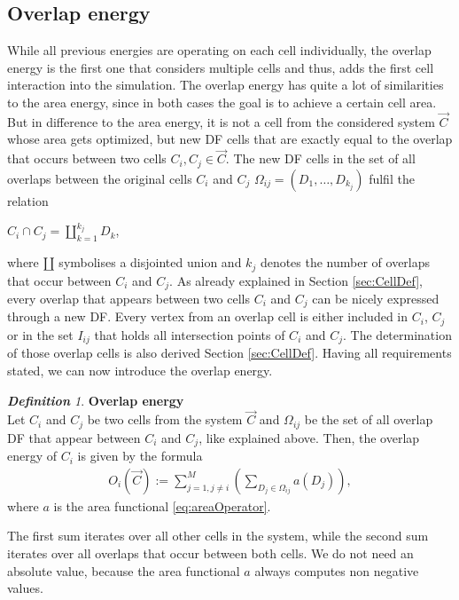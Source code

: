 \documentclass[a4paper,12pt,leqno]{article}
\theoremstyle{plain}
\theoremstyle{remark}
\newtheorem{definition}[theorem]{\bf Definition}
\begin{document}
\subsection{Overlap energy}  \label{sec:overlapEnergy} 
While all previous energies are operating on each cell individually, the overlap energy is the first one that considers multiple cells and thus, adds the first cell interaction into the simulation. The overlap energy has quite a lot of similarities to the area energy, since in both cases the goal is to achieve a certain cell area. \\
But in difference to the area energy, it is not a cell from the considered system $\vec{C}$ whose area gets optimized, but new DF cells that are exactly equal to the overlap that occurs between two cells $C_i, C_j \in \vec{C}$. The new DF cells in the set of all overlaps between the original cells $C_i$ and $C_j$ $\Omega_{ij} = (D_1, \ldots, D_{k_j})$ fulfil the relation 
\begin{center}
	$
	C_i \cap C_j = \amalg_{k=1}^{k_j} D_k
	$,
\end{center}
where $\amalg$ symbolises a disjointed union and $k_j$ denotes the number of overlaps that occur between $C_i$ and $C_j$. As already explained in Section \ref{sec:CellDef}, every overlap that appears between two cells $C_i$ and $C_j$ can be nicely expressed through a new DF. Every vertex from an overlap cell is either included in $C_i$, $C_j$ or in the set $I_{ij}$ that holds all intersection points of $C_i$ and $C_j$. The determination of those overlap cells is also derived Section \ref{sec:CellDef}. 
Having all requirements stated, we can now introduce the overlap energy. \\
\begin{definition} \textbf{Overlap energy} \\
	Let $C_i$ and $C_j$ be two cells from the system $\vec{C}$ and $\Omega_{ij}$ be the set of all overlap DF that appear between $C_i$ and $C_j$, like explained above. Then, the overlap energy of $C_i$ is given by the formula 
	\begin{align}
		O_i(\vec{C}) := \sum\limits_{j=1 , j \neq i}^{M} (\sum\limits_{D_j \in \Omega_{ij}} a(D_j)),		
	\end{align} 
	where $a$ is the area functional \eqref{eq:areaOperator}. \\
\end{definition}
The first sum iterates over all other cells in the system, while the second sum iterates over all overlaps that occur between both cells. We do not need an absolute value, because the area functional $a$ always computes non negative values. \\
\end{document}

